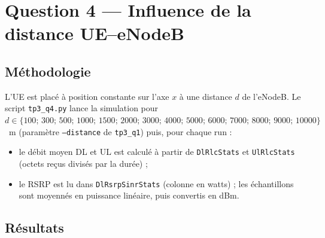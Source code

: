 \section{Question 4 --- Influence de la distance UE--eNodeB}

\subsection{Méthodologie}

L'UE est placé à position constante sur l'axe $x$ à une distance $d$ de
l'eNodeB. Le script \texttt{tp3\_q4.py} lance la simulation pour
$d \in \{100;\,300;\,500;\,1000;\,1500;\,2000;\,3000;\,4000;\,5000;\,6000;\,7000;\,8000;\,9000;\,10000\}$~m
(paramètre \texttt{--distance} de \texttt{tp3\_q1}) puis, pour chaque run :
\begin{itemize}[nosep]
\item le débit moyen DL et UL est calculé à partir de \texttt{DlRlcStats} et
\texttt{UlRlcStats} (octets reçus divisés par la durée) ;
\item le RSRP est lu dans \texttt{DlRsrpSinrStats} (colonne en watts) ; les
échantillons sont moyennés en puissance linéaire, puis convertis en dBm.
\end{itemize}

\subsection{Résultats}



